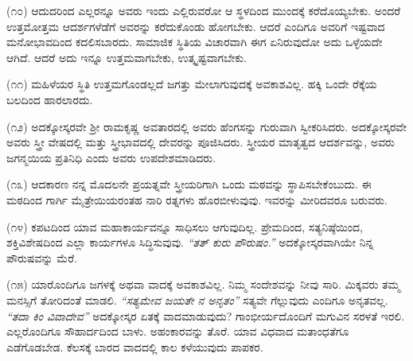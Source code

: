 \vspace{0.12cm}

(೧೦) ಆದುದರಿಂದ ಎಲ್ಲರನ್ನೂ ಅವರು ಇಂದು ಎಲ್ಲಿರುವರೋ ಆ ಸ್ಥಳದಿಂದ ಮುಂದಕ್ಕೆ ಕರೆದೊಯ್ಯಬೇಕು. ಅಂದರೆ ಉತ್ತಮೋತ್ತಮ ಆದರ್ಶಗಳೆಡೆಗೆ ಅವರನ್ನು ಕರೆದುಕೊಂಡು ಹೋಗಬೇಕು. ಆದರೆ ಎಂದಿಗೂ ಅವರಿಗೆ ಇಷ್ಟವಾದ ಮನೋಭಾವದಿಂದ ಕದಲಿಸಬಾರದು. ಸಾಮಾಜಿಕ ಸ್ಥಿತಿಯ ವಿಚಾರವಾಗಿ ಈಗ ಏನಿರುವುದೋ ಅದು ಒಳ್ಳೆಯದೇ ಆಗಿದೆ. ಆದರೆ ಅದು ಇನ್ನೂ ಉತ್ತಮವಾಗಬೇಕು, ಉತ್ಕೃಷ್ಟವಾಗಬೇಕು.

\vspace{0.1cm}

(೧೧) ಮಹಿಳೆಯರ ಸ್ಥಿತಿ ಉತ್ತಮಗೊಂಡಲ್ಲದೆ ಜಗತ್ತು ಮೇಲಾಗುವುದಕ್ಕೆ ಅವಕಾಶವಿಲ್ಲ. ಹಕ್ಕಿ ಒಂದೇ ರೆಕ್ಕೆಯ ಬಲದಿಂದ ಹಾರಲಾರದು.

\vspace{0.12cm}

(೧೨) ಅದಕ್ಕೋಸ್ಕರವೇ ಶ‍್ರೀ ರಾಮಕೃಷ್ಣ ಅವತಾರದಲ್ಲಿ ಅವರು ಹೆಂಗಸನ್ನು ಗುರುವಾಗಿ ಸ್ವೀಕರಿಸಿದರು. ಅದಕ್ಕೋಸ್ಕರವೇ ಅವರು ಸ್ತ್ರೀ ವೇಷದಲ್ಲಿ ಮತ್ತು ಸ್ತ್ರೀಭಾವದಲ್ಲಿ ದೇವರನ್ನು ಪೂಜಿಸಿದರು. ಸ್ತ್ರೀಯರ ಮಾತೃತ್ವದ ಆದರ್ಶವನ್ನು, ಅವರು ಜಗನ್ಮಯಿಯ ಪ್ರತಿನಿಧಿ ಎಂದು ಅವರು ಉಪದೇಶಮಾಡಿದರು.

\vspace{0.1cm}

(೧೩) ಆದಕಾರಣ ನನ್ನ ಮೊದಲನೇ ಪ್ರಯತ್ನವೇ ಸ್ತ್ರೀಯರಿಗಾಗಿ ಒಂದು ಮಠವನ್ನು ಸ್ಥಾಪಿಸಬೇಕೆಂಬುದು. ಈ ಮಠದಿಂದ ಗಾರ್ಗಿ ಮೈತ್ರೇಯಿಯರಂತಹ ನಾರಿ ರತ್ನಗಳು ಹೊರಬೀಳುವುವು. ಇವರನ್ನು ಮೀರಿದವರೂ ಬರುವರು.

\vspace{0.12cm}

(೧೪) ಕಪಟದಿಂದ ಯಾವ ಮಹಾಕಾರ್ಯವನ್ನೂ ಸಾಧಿಸಲು ಆಗುವುದಿಲ್ಲ. ಪ್ರೇಮದಿಂದ, ಸತ್ಯನಿಷ್ಠೆಯಿಂದ, ಶಕ್ತಿವಿಶೇಷದಿಂದ ಎಲ್ಲಾ ಕಾರ್ಯಗಳೂ ಸಿದ್ಧಿಸುವುವು. \textit{“ತತ್ ಕುರು ಪೌರುಷಂ.” } ಅದಕ್ಕೋಸ್ಕರವಾಗಿಯೇ ನಿನ್ನ ಪೌರುಷವನ್ನು ಮೆರೆ.

\vspace{0.12cm}

(೧೫) ಯಾರೊಂದಿಗೂ ಜಗಳಕ್ಕೆ ಅಥವಾ ವಾದಕ್ಕೆ ಅವಕಾಶವಿಲ್ಲ. ನಿಮ್ಮ ಸಂದೇಶವನ್ನು ನೀವು ಸಾರಿ. ಮಿಕ್ಕವರು ತಮ್ಮ ಮನಸ್ಸಿಗೆ ತೋರಿದಂತೆ ಮಾಡಲಿ. \textit{“ಸತ್ಯಮೇವ ಜಯತೇ ನ ಅನೃತಂ”} \enginline{-} ಸತ್ಯವೇ ಗೆಲ್ಲುವುದು ಎಂದಿಗೂ ಅನೃತವಲ್ಲ. \textit{“ತದಾ ಕಿಂ ವಿವಾದೇವ”}\enginline{-} ಅದಕ್ಕೋಸ್ಕರ ಏತಕ್ಕೆ ವಾದಮಾಡುವುದು? ಗಾಂಭೀರ್ಯದೊಂದಿಗೆ ಮಗುವಿನ ಸರಳತೆ ಇರಲಿ. ಎಲ್ಲರೊಂದಿಗೂ ಸೌಹಾರ್ದದಿಂದ ಬಾಳು. ಅಹಂಕಾರವನ್ನು ತೊರೆ. ಯಾವ ವಿಧವಾದ ಮತಾಂಧತೆಗೂ ಎಡೆಗೊಡಬೇಡ. ಕೆಲಸಕ್ಕೆ ಬಾರದ ವಾದದಲ್ಲಿ ಕಾಲ ಕಳೆಯುವುದು ಪಾಪಕರ.

